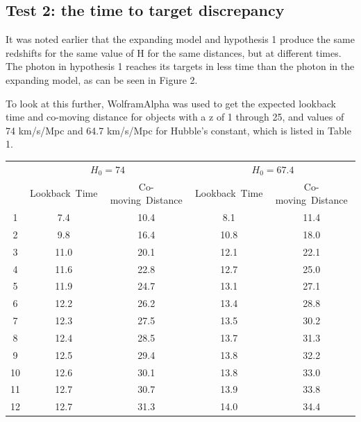 \documentclass{ws-mpla}
\begin{document}
\subsection{Test 2: the time to target discrepancy}

It was noted earlier that the expanding model and hypothesis 1 produce the same redshifts for the same value of H for the same distances, but at different times. 
The photon in hypothesis 1 reaches its targets in less time than the photon in the expanding model, as can be seen in Figure 2.

To look at this further, WolframAlpha was used to get the expected lookback time and co-moving distance for objects with a z of 1 through 25,
and values of 74 km/s/Mpc and 64.7 km/s/Mpc for Hubble's constant, which is listed in Table 1.


\begin{table}[p]
{\begin{tabular}{c@{\qquad}cc@{\qquad}cc}
  \toprule
  \multirow{2}{*}{\raisebox{-\heavyrulewidth}{$z$}} & \multicolumn{2}{c}{$H_{0}=74$} & \multicolumn{2}{c}{$H_{0}=67.4$} \\
  \cmidrule{2-5}
  & Lookback~Time & Co-moving~Distance & Lookback~Time & Co-moving~Distance \\
  \midrule
     1    &    7.4   &    10.4   &    8.1   &    11.4 \\ 
     2    &    9.8   &    16.4   &   10.8   &    18.0 \\ 
     3    &   11.0   &    20.1   &   12.1   &    22.1 \\ 
     4    &   11.6   &    22.8   &   12.7   &    25.0 \\ 
     5    &   11.9   &    24.7   &   13.1   &    27.1 \\ 
     6    &   12.2   &    26.2   &   13.4   &    28.8 \\ 
     7    &   12.3   &    27.5   &   13.5   &    30.2 \\ 
     8    &   12.4   &    28.5   &   13.7   &    31.3 \\ 
     9    &   12.5   &    29.4   &   13.8   &    32.2 \\ 
    10    &   12.6   &    30.1   &   13.8   &    33.0 \\ 
    11    &   12.7   &    30.7   &   13.9   &    33.8 \\ 
    12    &   12.7   &    31.3   &   14.0   &    34.4 \\ 

\end{tabular}}
\end{table}
\end{document}

